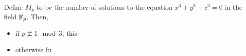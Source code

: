 
\begin{theorem}
Define $M_p$ to be the number of solutions to the equation $x^3 + y^3 + z^3 = 0$ in the field $\mathbb{F}_p$. Then,
\begin{itemize}
	\item if $p \not\equiv 1 \mod{3}$, this
\item otherwise fu
\end{itemize}
\end{theorem}
